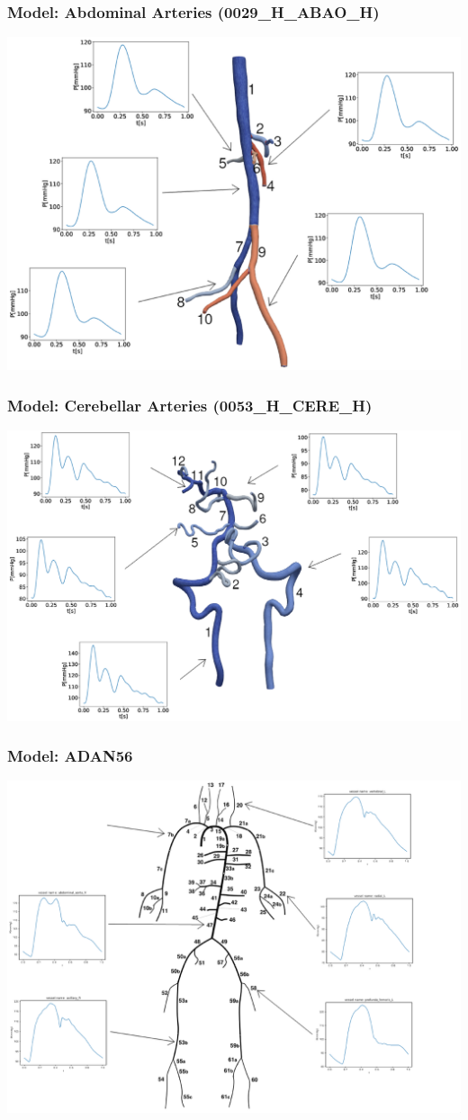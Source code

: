 \documentclass{beamer}
\begin{document}
\begin{frame}
	\frametitle{Model: Abdominal Arteries (0029\_H\_ABAO\_H)}
	\includegraphics[width=\columnwidth]{images/0029.eps}
\end{frame}
\begin{frame}
	\frametitle{Model: Cerebellar Arteries (0053\_H\_CERE\_H)}
	\includegraphics[width=\columnwidth]{images/0053.eps}
\end{frame}
\begin{frame}
	\frametitle{Model: ADAN56}
	\includegraphics[width=\textwidth]{images/adan56.eps}
\end{frame}
\end{document}
